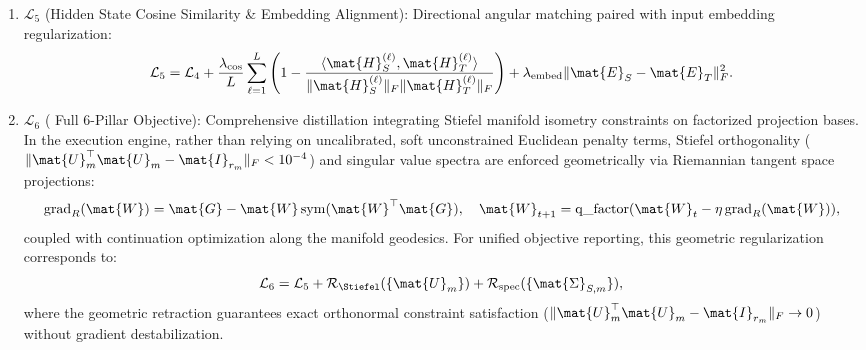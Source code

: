 \begin{itemize}
\begin{enumerate}
\begin{equation}
        \end{equation}
        \item $\mathcal{L}_5$ (Hidden State Cosine Similarity \& Embedding Alignment): Directional angular matching paired with input embedding regularization:
        \begin{equation}
        \mathcal{L}_5 = \mathcal{L}_4 + \frac{\lambda_{\text{cos}}}{L} \sum_{\ell=1}^L \left(1 - \frac{\langle \mat{H}_S^{(\ell)}, \mat{H}_T^{(\ell)} \rangle}{\|\mat{H}_S^{(\ell)}\|_F \|\mat{H}_T^{(\ell)}\|_F}\right) + \lambda_{\text{embed}} \|\mat{E}_S - \mat{E}_T\|_F^2.
        \end{equation}
        \item $\mathcal{L}_6$ (\neuralops{} Full 6-Pillar Objective): Comprehensive distillation integrating Stiefel manifold isometry constraints on factorized projection bases. In the \neuralops{} execution engine, rather than relying on uncalibrated, soft unconstrained Euclidean penalty terms, Stiefel orthogonality ($\|\mat{U}_m^\top \mat{U}_m - \mat{I}_{r_m}\|_F < 10^{-4}$) and singular value spectra are enforced geometrically via Riemannian tangent space projections:
        \begin{equation}
        \operatorname{grad}_R(\mat{W}) = \mat{G} - \mat{W} \operatorname{sym}(\mat{W}^\top \mat{G}), \quad \mat{W}_{t+1} = \operatorname{q\_factor}(\mat{W}_t - \eta \operatorname{grad}_R(\mat{W})),
        \end{equation}
        coupled with continuation optimization along the manifold geodesics. For unified objective reporting, this geometric regularization corresponds to:
        \begin{equation}
        \mathcal{L}_6 = \mathcal{L}_5 + \mathcal{R}_{\Stiefel}(\{\mat{U}_m\}) + \mathcal{R}_{\text{spec}}(\{\mat{\Sigma}_{S,m}\}),
        \label{eq:full_6pillar_loss}
        \end{equation}
        where the geometric retraction guarantees exact orthonormal constraint satisfaction ($\|\mat{U}_m^\top \mat{U}_m - \mat{I}_{r_m}\|_F \to 0$) without gradient destabilization.
    \end{enumerate}
    

\end{itemize}
